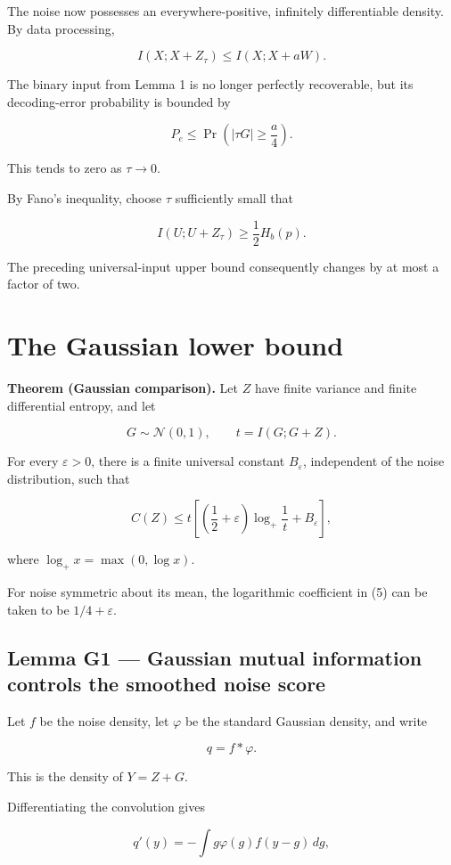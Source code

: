 \documentclass[11pt]{article}
\begin{document}
The noise now possesses an everywhere-positive, infinitely differentiable density. By data processing,

\[
I(X;X+Z_\tau)\leq I(X;X+aW).
\]

The binary input from Lemma 1 is no longer perfectly recoverable, but its decoding-error probability is bounded by

\[
P_e\leq
\Pr\left(|\tau G|\geq\frac a4\right).
\]

This tends to zero as \(\tau\to0\).

By Fano's inequality, choose \(\tau\) sufficiently small that

\[
I(U;U+Z_\tau)\geq\frac12H_b(p).
\]

The preceding universal-input upper bound consequently changes by at most a factor of two.

\section{The Gaussian lower bound}

\textbf{Theorem (Gaussian comparison).} Let \(Z\) have finite variance and finite differential entropy, and let

\[
G\sim\mathcal N(0,1),\qquad
t=I(G;G+Z).
\]

For every \(\varepsilon>0\), there is a finite universal constant \(B_\varepsilon\), independent of the noise distribution, such that

\[
\boxed{
C(Z)
\leq
t\left[
\left(\frac12+\varepsilon\right)
\log_+\frac1t+B_\varepsilon
\right],
}
\tag{5}
\]

where \(\log_+x=\max(0,\log x)\).

For noise symmetric about its mean, the logarithmic coefficient in (5) can be taken to be \(1/4+\varepsilon\).

\subsection{Lemma G1 --- Gaussian mutual information controls the smoothed noise score}

Let \(f\) be the noise density, let \(\varphi\) be the standard Gaussian density, and write

\[
q=f*\varphi.
\]

This is the density of \(Y=Z+G\).

Differentiating the convolution gives

\[
q'(y)
=-\int g\varphi(g)f(y-g)\,dg,
\]
\end{document}
